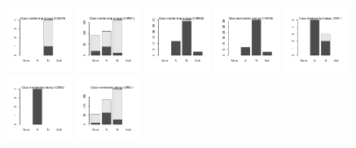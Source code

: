 \documentclass[utf8]{frontiersSCNS} %
\begin{document}
\begin{figure}[h!]
\includegraphics[width=0.19\textwidth]{figures/validation_plots/cckar_0p9_valplot.pdf}
\includegraphics[width=0.19\textwidth]{figures/validation_plots/chrm1_0p9_valplot.pdf}
\includegraphics[width=0.19\textwidth]{figures/validation_plots/chrm2_0p9_valplot.pdf}
\includegraphics[width=0.19\textwidth]{figures/validation_plots/chrm3_0p9_valplot.pdf}
\includegraphics[width=0.19\textwidth]{figures/validation_plots/cnr1_0p9_valplot.pdf}
\includegraphics[width=0.19\textwidth]{figures/validation_plots/cnr2_0p9_valplot.pdf}
\includegraphics[width=0.19\textwidth]{figures/validation_plots/drd1_0p9_valplot.pdf}

\end{figure}
\end{document}
